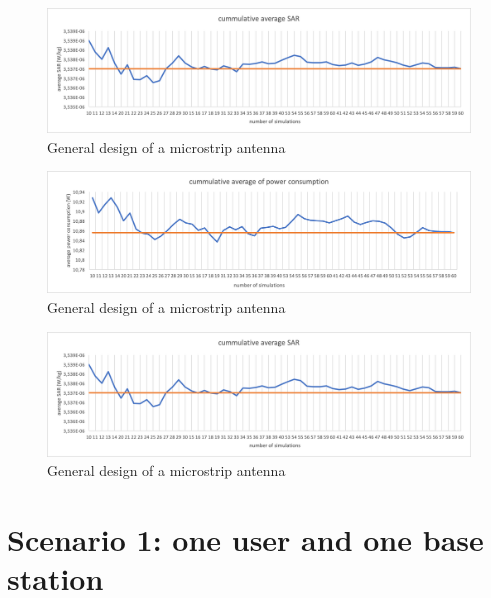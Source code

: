\begin{figure}[th!]
  \includegraphics[width=\textwidth]{../results/numberOfSim/sarvssim.png}
  \caption{General design of a microstrip antenna}
  \label{fig:fhsar}
\end{figure}
\begin{figure}[th!]
  \includegraphics[width=\textwidth]{../results/numberOfSim/pcvssim.png}
  \caption{General design of a microstrip antenna}
  \label{fig:fhsar}
\end{figure}
\begin{figure}[th!]
  \includegraphics[width=\textwidth]{../results/numberOfSim/sarvssim.png}
  \caption{General design of a microstrip antenna}
  \label{fig:fhsar}
\end{figure}

\section{Scenario 1: one user and one base station}

